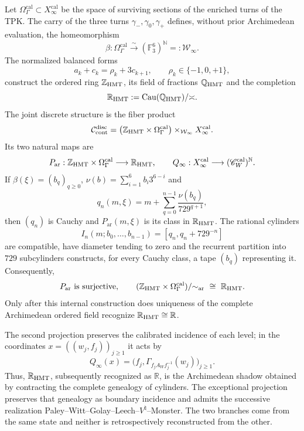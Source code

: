 \begin{theorem}
\label{thm:c27-tesis-rectora-doble-proyeccion}
Let \(\Omega_\Gamma^{\mathrm{cal}}\subset
X_\infty^{\mathrm{cal}}\) be the space of surviving sections of the
enriched turns of the TPK. The carry of the three turns
\(\gamma_-,\gamma_0,\gamma_+\) defines, without prior Archimedean evaluation,
the homeomorphism
\[
 \beta:\Omega_\Gamma^{\mathrm{cal}}\xrightarrow{\ \sim\ }
 (\mathbb F_3^6)^{\mathbb N}=: \mathcal W_\infty.
\]
The normalized balanced forms
\[
 a_k+c_k=\rho_k+3c_{k+1},\qquad
 \rho_k\in\{-1,0,+1\},
\]
construct the ordered ring \(\mathbb Z_{\rm HMT}\), its field of
fractions \(\mathbb Q_{\rm HMT}\) and the completion
\[
 \mathbb R_{\rm HMT}:=
 \operatorname{Cau}(\mathbb Q_{\rm HMT})/{\asymp}.
\]
The joint discrete structure is the fiber product
\[
\mathcal C_{\mathrm{cont}}^{\mathrm{disc}}
=\bigl(\mathbb Z_{\rm HMT}\times
\Omega_\Gamma^{\mathrm{cal}}\bigr)
\times_{\mathcal W_\infty}X_\infty^{\mathrm{cal}}.
\]
Its two natural maps are
\[
 P_{\mathrm{ar}}:\mathbb Z_{\rm HMT}\times
 \Omega_\Gamma^{\mathrm{cal}}\longrightarrow\mathbb R_{\rm HMT},
 \qquad
 Q_\infty:X_\infty^{\mathrm{cal}}\longrightarrow
 (\mathscr C_W^{\mathrm{cal}})^{\mathbb N}.
\]
If \(\beta(\xi)=(b_q)_{q\geq0}\),
\(\nu(b)=\sum_{i=1}^{6}b_i3^{6-i}\) and
\[
 q_n(m,\xi)=m+\sum_{q=0}^{n-1}
 \frac{\nu(b_q)}{729^{q+1}},
\]
then \((q_n)\) is Cauchy and \(P_{\mathrm{ar}}(m,\xi)\) is its class
in \(\mathbb R_{\rm HMT}\). The rational cylinders
\[
 I_n(m;b_0,\ldots,b_{n-1})=
 \left[q_n,q_n+729^{-n}\right]
\]
are compatible, have diameter tending to zero and the recurrent partition
into \(729\) subcylinders constructs, for every Cauchy class, a tape
\((b_q)\) representing it. Consequently,
\[
 P_{\mathrm{ar}}\ \text{is surjective},\qquad
 (\mathbb Z_{\rm HMT}\times\Omega_\Gamma^{\mathrm{cal}})
 /{\sim_{\rm ar}}\ \cong\ \mathbb R_{\rm HMT}.
\]
Only after this internal construction does uniqueness of the complete Archimedean ordered
field recognize \(\mathbb R_{\rm HMT}\cong\mathbb R\).

The second projection preserves the calibrated incidence of each level; in the
coordinates \(x=((w_j,f_j))_{j\geq1}\) it acts by
\[
 Q_\infty(x)
 =\bigl(f_j,\Gamma_{f_jA_Wf_j^{-1}}(w_j)\bigr)_{j\geq1}.
\]
Thus, \(\mathbb R_{\rm HMT}\), subsequently recognized as \(\mathbb R\),
is the Archimedean shadow obtained by contracting the complete genealogy of
cylinders. The exceptional projection preserves that genealogy as boundary
incidence and admits the successive realization
Paley--Witt--Golay--Leech--\(V^\natural\)--Monster. The two branches come
from the same state and neither is retrospectively reconstructed from the other.
\end{theorem}

